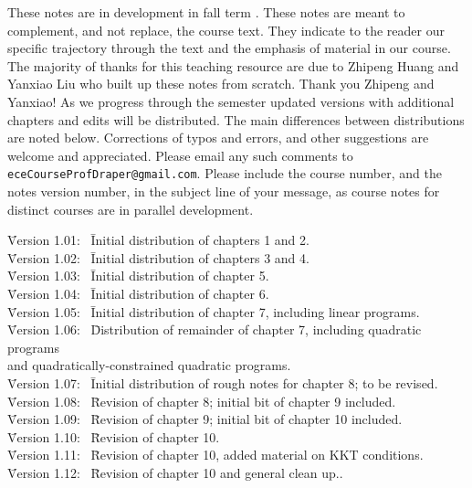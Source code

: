 \documentclass{tufte-book} %
\theoremstyle{definition}
\theoremstyle{remark}
\numberwithin{section}{chapter}
\numberwithin{equation}{chapter}
\numberwithin{figure}{chapter}
\begin{document}
\noindent These notes are in development in fall term \the\year.
These notes are meant to complement, and not replace, the course text.
They indicate to the reader our specific trajectory through the text
and the emphasis of material in our course.  The majority of thanks
for this teaching resource are due to Zhipeng Huang and Yanxiao Liu
who built up these notes from scratch.  Thank you Zhipeng and Yanxiao!
As we progress through the semester updated versions with additional
chapters and edits will be distributed.  The main differences between
distributions are noted below.  Corrections of typos and errors, and
other suggestions are welcome and appreciated.  Please email any such
comments to \texttt{eceCourseProfDraper@gmail.com}.  Please include
the course number, and the notes version number,  in the subject line of your message, as course notes
for distinct courses are in parallel development. \vspace{0.2in} \\

\begin{tabbing}
\noindent \= Version 1.01: \ \= Initial distribution of chapters 1 and 2.\\
\noindent \= Version 1.02: \ \= Initial distribution of chapters 3 and 4.\\
\noindent \= Version 1.03: \ \= Initial distribution of chapter 5.\\
\noindent \= Version 1.04: \ \= Initial distribution of chapter 6.\\
\noindent \= Version 1.05: \ \= Initial distribution of chapter 7, including linear programs.\\
\noindent \= Version 1.06: \ \= Distribution of remainder of chapter 7, including quadratic programs \\ \hspace{6em} and quadratically-constrained quadratic programs.\\
\noindent \= Version 1.07: \ \= Initial distribution of rough notes for chapter 8; to be revised.\\
\noindent \= Version 1.08: \ \= Revision of chapter 8; initial bit of chapter 9 included.\\
\noindent \= Version 1.09: \ \= Revision of chapter 9; initial bit of chapter 10 included.\\
\noindent \= Version 1.10: \ \= Revision of chapter 10.\\
\noindent \= Version 1.11: \ \= Revision of chapter 10, added material on KKT conditions.\\
\noindent \= Version 1.12: \ \= Revision of chapter 10 and general clean up..\\

\end{tabbing}
\end{document}
